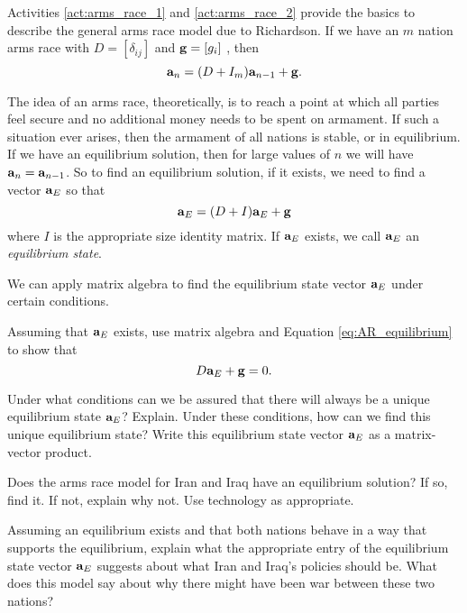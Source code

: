 Activities \ref{act:arms_race_1} and \ref{act:arms_race_2} provide the basics to describe the general arms race model due to Richardson. If we have an $m$ nation arms race with $D = [\delta_{ij}]$ and $\mathbf{g} = [g_i]$ , then 
\begin{equation} \label{eq:AR_model}
\mathbf{a}_n =  (D+I_m)\mathbf{a}_{n-1}+\mathbf{g}.
\end{equation}


\begin{pactivity} The idea of an arms race, theoretically, is to reach a point at which all parties feel secure and no additional money needs to be spent on armament. If such a situation ever arises, then the armament of all nations is stable, or in equilibrium. If we have an equilibrium solution, then for large values of $n$ we will have $\mathbf{a}_n = \mathbf{a}_{n-1}$. So to find an equilibrium solution, if it exists, we need to find a vector $\mathbf{a}_E$ so that 
\begin{equation} \label{eq:AR_equilibrium}
\mathbf{a}_E = (D+I)\mathbf{a}_E + \mathbf{g}
\end{equation}
where $I$ is the appropriate size identity matrix. If $\mathbf{a}_{E}$ exists, we call $\mathbf{a}_E$ an \emph{equilibrium state}.

We can apply matrix algebra to find the equilibrium state vector $\mathbf{a}_E$ under certain conditions. 
	\ba
   \item Assuming that $\mathbf{a}_E$ exists, use matrix algebra and Equation \ref{eq:AR_equilibrium} to show that 
    \begin{equation} \label{eq:AR_equilibrium_2}
    D\mathbf{a}_E + \mathbf{g} = 0.
    \end{equation}


\item Under what conditions can we be assured that there will always be a unique equilibrium state $\mathbf{a}_{E}$? Explain. Under these conditions, how can we find this unique equilibrium state? Write this equilibrium state vector $\mathbf{a}_{E}$ as a matrix-vector product.

\item Does the arms race model for Iran and Iraq have an equilibrium solution? If so, find it. If not, explain why not. Use technology as appropriate. 

\item Assuming an equilibrium exists and that both nations behave in a way that supports the equilibrium, explain what the appropriate entry of the equilibrium state vector $\mathbf{a}_E$ suggests about what Iran and Iraq's  policies should be. What does this model say about why there might have been war between these two nations? 


\ea

\end{pactivity}



